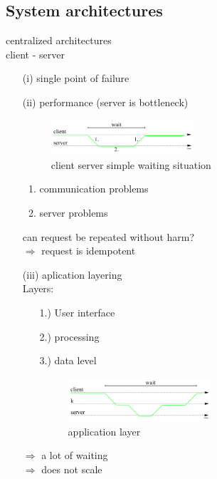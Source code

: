 \documentclass[ngerman,a4paper]{report}
\begin{document}
{\subsection{System architectures}
\begin{enummerate}
\item centralized architectures\\
client - server\\
\begin{itemize}
\item[(i)] single point of failure
\item[(ii)] performance (server is bottleneck)\\
\begin{figure}
	\centering
	\includegraphics[width=200px]{gfx/cs_simple_wait.png}
	\caption{client server simple waiting situation}
	\label{img:cs_simple_wait}
\end{figure}
\begin{enumerate}
\item communication problems\\
\item server problems\\
\end{enumerate}
can request be repeated without harm?\\
$\Rightarrow$ request is idempotent
\item[(iii)] aplication layering\\
Layers:\begin{itemize}
\item[1.)] User interface
\item[2.)] processing
\item[3.)] data level
\begin{figure}
	\centering
	\includegraphics[width=200px]{gfx/cs_app_layer.png}
	\caption{application layer}
	\label{img:cs_app_layer}
\end{figure}
\end{itemize}
$\Rightarrow$ a lot of waiting\\
$\Rightarrow$ does not scale\\
\end{itemize}

\end{enummerate}}
\end{document}
